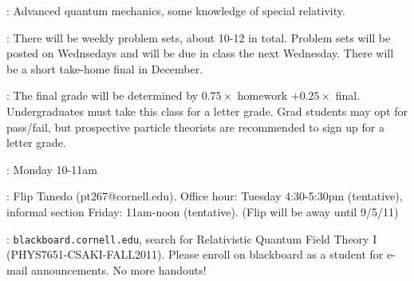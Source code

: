 : Advanced quantum mechanics, some knowledge of special relativity. 

\vspace*{0.5cm}

: There will be weekly problem
sets, about 10-12 in total. Problem sets will be posted on Wednsedays
 and will be due in class the next Wednesday. There will be a short take-home final in December. \vspace*{0.5cm}

: The final grade will be determined by
$0.75 \times$ homework $+0.25\times$ final. Undergraduates must take this class for a letter grade. Grad students may opt for pass/fail, but prospective particle theorists are recommended to sign up for a letter grade. 
  \vspace*{0.5cm}



: Monday 10-11am \vspace*{0.5cm}

: Flip Tanedo (pt267@cornell.edu). Office hour: Tuesday 4:30-5:30pm (tentative), informal section Friday: 11am-noon (tentative). (Flip will be away until 9/5/11) \vspace*{0.5cm}

: {\tt blackboard.cornell.edu}, search for Relativistic Quantum Field Theory I  (PHYS7651-CSAKI-FALL2011).
Please enroll on blackboard as a student for e-mail announcements. No more handouts!






